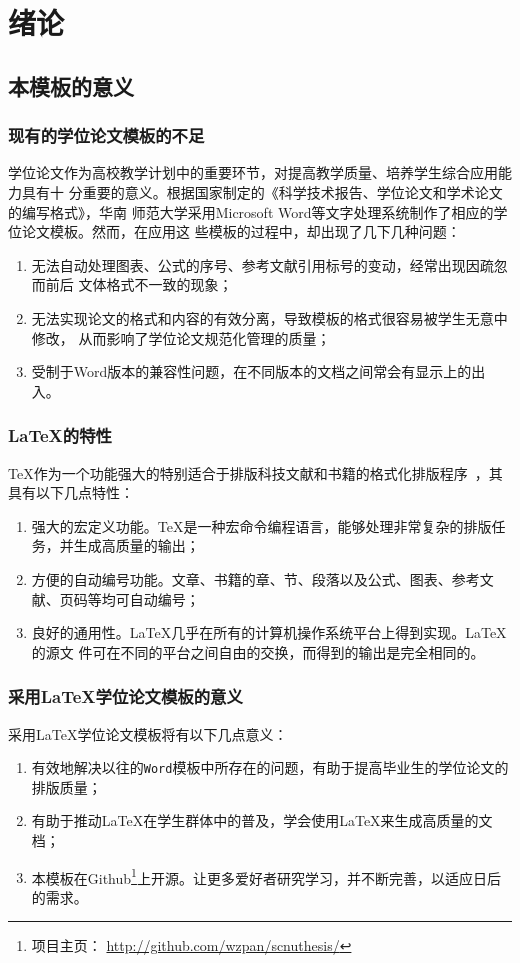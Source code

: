 \chapter{绪论}

\section{本模板的意义}

\subsection{现有的学位论文模板的不足}
学位论文作为高校教学计划中的重要环节，对提高教学质量、培养学生综合应用能力具有十%
分重要的意义。根据国家制定的《科学技术报告、学位论文和学术论文的编写格式》，华南%
师范大学采用Microsoft Word等文字处理系统制作了相应的学位论文模板。然而，在应用这%
些模板的过程中，却出现了几下几种问题\cite{Maddage2009}：
\begin{enumerate}
\item 无法自动处理图表、公式的序号、参考文献引用标号的变动，经常出现因疏忽而前后%
  文体格式不一致的现象；
\item 无法实现论文的格式和内容的有效分离，导致模板的格式很容易被学生无意中修改，%
  从而影响了学位论文规范化管理的质量；
\item 受制于Word版本的兼容性问题，在不同版本的文档之间常会有显示上的出入。%
\end{enumerate}

\subsection{\LaTeX{}的特性}
\TeX{}作为一个功能强大的特别适合于排版科技文献和书籍的格式化排版程序~，其具有以下几点特性：
\begin{enumerate}
\item 强大的宏定义功能。\TeX{}是一种宏命令编程语言，能够处理非常复杂的排版任务，并生成高质量的输出；
\item 方便的自动编号功能。文章、书籍的章、节、段落以及公式、图表、参考文献、页码等均可自动编号；
\item 良好的通用性。\LaTeX{}几乎在所有的计算机操作系统平台上得到实现。\LaTeX{}的源文%
  件可在不同的平台之间自由的交换，而得到的输出是完全相同的。
\end{enumerate}




\subsection{采用\LaTeX{}学位论文模板的意义}
采用\LaTeX{}学位论文模板将有以下几点意义：
\begin{enumerate}
\item 有效地解决以往的\verb|Word|模板中所存在的问题，有助于提高毕业生的学位论文的排版质量；
\item 有助于推动LaTeX在学生群体中的普及，学会使用\LaTeX{}来生成高质量的文档；
\item 本模板在Github\footnote{项目主页：
    \url{http://github.com/wzpan/scnuthesis/}}上开源。让更多爱好者研究学习，并不断完善，以适应日后的需求。
\end{enumerate}


